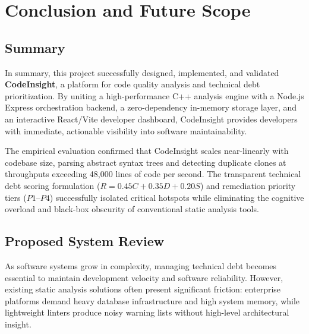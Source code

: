 \chapter{Conclusion and Future Scope}

\section{Summary}
In summary, this project successfully designed, implemented, and validated \textbf{CodeInsight}, a platform for code quality analysis and technical debt prioritization. By uniting a high-performance C++ analysis engine with a Node.js Express orchestration backend, a zero-dependency in-memory storage layer, and an interactive React/Vite developer dashboard, CodeInsight provides developers with immediate, actionable visibility into software maintainability. 

The empirical evaluation confirmed that CodeInsight scales near-linearly with codebase size, parsing abstract syntax trees and detecting duplicate clones at throughputs exceeding 48,000 lines of code per second. The transparent technical debt scoring formulation ($R = 0.45C + 0.35D + 0.20S$) and remediation priority tiers ($P1$--$P4$) successfully isolated critical hotspots while eliminating the cognitive overload and black-box obscurity of conventional static analysis tools.

\section{Proposed System Review}
As software systems grow in complexity, managing technical debt becomes essential to maintain development velocity and software reliability. However, existing static analysis solutions often present significant friction: enterprise platforms demand heavy database infrastructure and high system memory, while lightweight linters produce noisy warning lists without high-level architectural insight.

